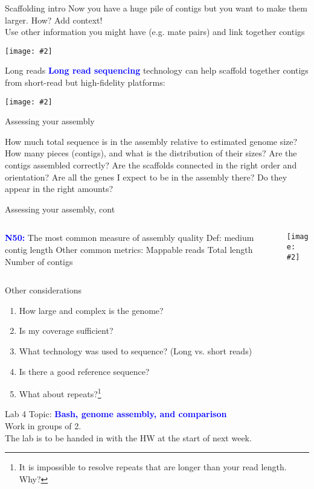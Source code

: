 \documentclass{beamer}
\renewcommand{\c}[1]{\begin{center}#1\end{center}}
\newcommand{\blu}[1]{\textcolor{blue}{\textbf{#1}}}
\newcommand{\gr}[2][.95]{\c{\texttt{[image: \#2]}}}
\begin{document}
\begin{frame}{Scaffolding intro}
Now you have a huge pile of contigs but you want to make them larger. How? Add context!\\
\bigskip Use other information you might have (e.g. mate pairs) and link together contigs
\gr{l4_figs/s24_scaffolding.png}
\end{frame}

\begin{frame}{Long reads}
\blu{Long read sequencing} technology can help scaffold together contigs from short-read but high-fidelity platforms: 
\gr{l4_figs/s25_long_reads.png}
\end{frame}

\begin{frame}{Assessing your assembly}
\begin{outline}
    \1[] How much total sequence is in the assembly relative to estimated genome size?
    \1[] How many pieces (contigs), and what is the distribution of their sizes?
    \1[] Are the contigs assembled correctly?
    \1[] Are the scaffolds connected in the right order and orientation?
    \1[] Are all the genes I expect to be in the assembly there? Do they appear in the right amounts?
\end{outline}
\end{frame}

\begin{frame}{Assessing your assembly, cont}
\begin{columns}
\begin{column}{0.5\textwidth}
 \begin{outline}
     \1[] \blu{N50:} The most common measure of assembly quality
        \2[] Def: medium contig length
    \1[] Other common metrics:
        \2 Mappable reads
        \2 Total length
        \2 Number of contigs
 \end{outline}
\end{column}
\begin{column}{0.5\textwidth}
    \gr{l4_figs/s27_quality.png}
\end{column}
\end{columns}
\end{frame}

\begin{frame}{Other considerations}
\begin{enumerate}
    \item How large and complex is the genome?
    \item Is my coverage sufficient?
    \item What technology was used to sequence? (Long vs. short reads)
    \item Is there a good reference sequence?
    \item What about repeats?\footnote{It is impossible to resolve repeats that are longer than your read length. Why?}
\end{enumerate}
\end{frame}

\begin{frame}{Lab 4}
Topic: \blu{Bash, genome assembly, and comparison}\\
\bigskip
Work in groups of 2.\\
\bigskip
The lab is to be handed in with the HW at the start of next week.
\end{frame}
\end{document}
